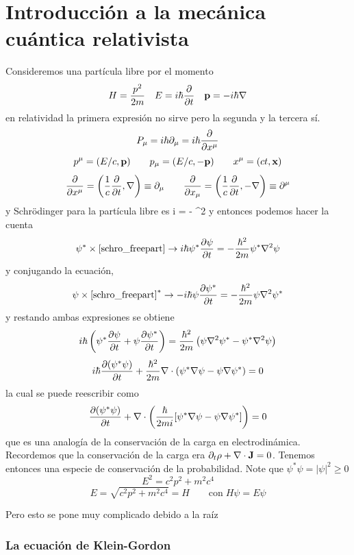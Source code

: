 \documentclass[10pt,oneside]{CBFT_book}
\begin{document}
\chapter{Introducción a la mecánica cuántica relativista}

Consideremos una partícula libre por el momento 
\[
	H = \frac{p^2}{2m} \quad E =  i\hbar \dpar{}{t} \quad \vb{p} = - i\hbar \Nabla
\]
en relatividad la primera expresión no sirve pero la segunda y la tercera sí.
\[
	P_\mu = i \hbar \partial_\mu = i \hbar \frac{\partial^{\hspace{-0.05em}} {}}{\partial {x^\mu}^{\hspace{-0.05em}}}
\]
\[
	p^\mu = (E/c, \vb{p}) \qquad p_\mu = (E/c, -\vb{p}) \qquad x^\mu = (ct, \vb{x})
\]
\[
	\frac{\partial^{\hspace{-0.05em}} {}}{\partial {x^\mu}^{\hspace{-0.05em}}} = \left( \frac{1}{c}\frac{\partial^{\hspace{-0.05em}} {}}{\partial {t}^{\hspace{-0.05em}}} , \mathbf{\nabla} \right) \equiv \partial_\mu
	\qquad \frac{\partial^{\hspace{-0.05em}} {}}{\partial {x_\mu}^{\hspace{-0.05em}}} = \left( \frac{1}{c}\frac{\partial^{\hspace{-0.05em}} {}}{\partial {t}^{\hspace{-0.05em}}} , -\mathbf{\nabla} \right) \equiv \partial^\mu
\]
y Schrödinger para la partícula libre es
\be \label{schro_freepart}
	i \hbar {} = -  \nabla^2 \psi
\ee
y entonces podemos hacer la cuenta 
\[
	\psi^* \times \eqref{schro_freepart} \rightarrow  
	i \hbar \psi^*\frac{\partial^{\hspace{-0.05em}} {\psi}}{\partial {t}^{\hspace{-0.05em}}} = - \frac{\hbar^2}{2m} \psi^* \nabla^2 \psi
\]
y conjugando la ecuación,
\[
	\psi \times \eqref{schro_freepart}^* \rightarrow  
	-i \hbar \psi\frac{\partial^{\hspace{-0.05em}} {\psi^*}}{\partial {t}^{\hspace{-0.05em}}} = - \frac{\hbar^2}{2m} \psi \nabla^2 \psi^*
\]
y restando ambas expresiones se obtiene 
\[
	i \hbar \left( \psi^*\frac{\partial^{\hspace{-0.05em}} {\psi}}{\partial {t}^{\hspace{-0.05em}}} + \psi\frac{\partial^{\hspace{-0.05em}} {\psi^*}}{\partial {t}^{\hspace{-0.05em}}} \right) =
	\frac{\hbar^2}{2m} \left( \psi \nabla^2 \psi^* -\psi^* \nabla^2 \psi \right)
\]
\[
	i \hbar  \frac{\partial^{\hspace{-0.05em}} { (\psi^* \psi) }}{\partial {t}^{\hspace{-0.05em}}} + \frac{\hbar^2}{2m} 
	\mathbf{\nabla} \cdot \left( \psi^* \mathbf{\nabla} \psi - \psi \mathbf{\nabla} \psi^* \right) = 0
\]
la cual se puede reescribir como
\[
	\frac{\partial^{\hspace{-0.05em}} { (\psi^* \psi) }}{\partial {t}^{\hspace{-0.05em}}} +  
	\mathbf{\nabla} \cdot \left( \frac{\hbar}{2mi} [\psi^* \mathbf{\nabla} \psi - \psi \mathbf{\nabla} \psi^*] \right) = 0
\]
que es una analogía de la conservación de la carga en electrodinámica. Recordemos que la conservación de la carga era
$ \partial_t \rho + \nabla \cdot \vb{J} = 0$.
Tenemos entonces una especie de conservación de la probabilidad. Note que $\psi^* \psi = |\psi|^2 \geq 0$
\[
	E^2 = c^2 p^2 + m^2 c^4
\]
\[
	E = \sqrt{ c^2 p^2 + m^2 c^4 } = H \qquad \text{con} \; H\psi = E\psi
\]

Pero esto se pone muy complicado debido a la raíz

\subsection{La ecuación de Klein-Gordon}
\end{document}

